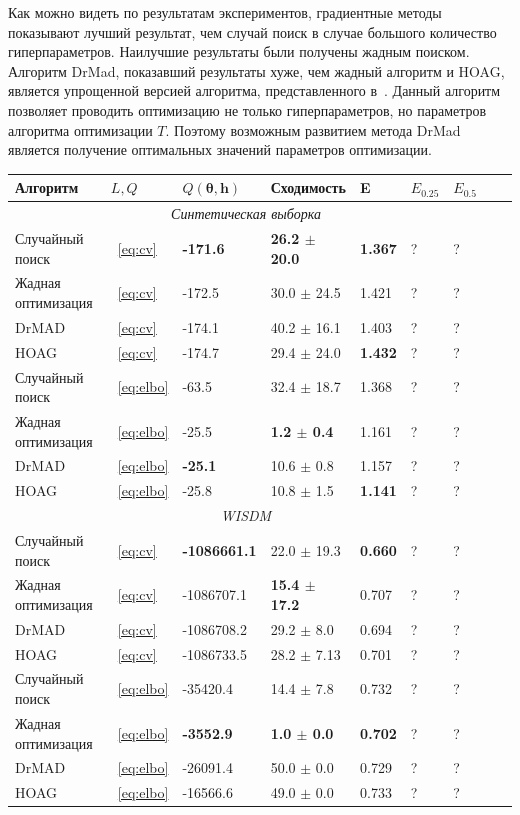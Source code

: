 Как можно видеть по результатам экспериментов, градиентные методы показывают лучший результат, чем случай поиск в случае большого количество гиперпараметров. Наилучшие результаты были получены жадным поиском. Алгоритм DrMad, показавший результаты хуже, чем жадный алгоритм и HOAG, является упрощенной версией алгоритма, представленного в~\cite{hyper_mad}. Данный алгоритм позволяет проводить оптимизацию не только гиперпараметров, но параметров алгоритма оптимизации $T$. Поэтому возможным развитием  метода DrMad является получение оптимальных значений параметров оптимизации.

\begin{table}
\small
\begin{tabularx}{\textwidth}{ |X|X|X|X|X|X|X|X|X|}

\hline
\textbf{Алгоритм} & $L, Q$  & $Q(\boldsymbol{\theta}, \mathbf{h})$ & Сходимость & E & $E_{0.25}$ & $E_{0.5}$\\ 
\hline
\multicolumn{7}{|c|}{\textit{Синтетическая выборка}}  \\
\hline
Случайный поиск & ~\eqref{eq:cv} & \bf -171.6  &\bf 26.2 $\pm$ 20.0  & \bf 1.367 & ? & ? \\
\hline
Жадная оптимизация & ~\eqref{eq:cv} & -172.5 & 30.0 $\pm$ 24.5 & 1.421 & ? & ? \\
\hline
DrMAD & ~\eqref{eq:cv} & -174.1 & 40.2 $\pm$ 16.1 &  1.403 & ? & ?\\
\hline
HOAG & ~\eqref{eq:cv} &-174.7 & 29.4 $\pm$ 24.0 &   \bf 1.432  & ? & ?\\
\hline
Случайный поиск & ~\eqref{eq:elbo} & -63.5  & 32.4 $\pm$ 18.7  & 1.368 & ? & ?  \\
\hline
Жадная оптимизация & ~\eqref{eq:elbo} & -25.5 & \bf 1.2 $\pm$ 0.4 & 1.161 & ? & ?\\
\hline
DrMAD & ~\eqref{eq:elbo} & \bf -25.1 &  10.6 $\pm$ 0.8 &  1.157 & ? & ?\\
\hline
HOAG & ~\eqref{eq:elbo} &-25.8 & 10.8 $\pm$ 1.5&   \bf 1.141  & ? & ?\\
\hline


\multicolumn{7}{|c|}{\textit{WISDM}}  \\
\hline
Случайный поиск & ~\eqref{eq:cv} & \bf -1086661.1  & 22.0 $\pm$ 19.3  & \bf 0.660 & ? & ? \\
\hline
Жадная оптимизация & ~\eqref{eq:cv} & -1086707.1 & \bf 15.4 $\pm$ 17.2 & 0.707 & ? & ? \\
\hline
DrMAD & ~\eqref{eq:cv} & -1086708.2 & 29.2 $\pm$ 8.0 &  0.694 & ? & ? \\
\hline
HOAG & ~\eqref{eq:cv} & -1086733.5 & 28.2 $\pm$ 7.13&   0.701 & ? & ? \\
\hline
Случайный поиск & ~\eqref{eq:elbo} & -35420.4 &   14.4 $\pm$ 7.8  &   0.732 & ? & ? \\
\hline
Жадная оптимизация & ~\eqref{eq:elbo} & \bf -3552.9 &\bf 1.0 $\pm$ 0.0  &   \bf 0.702 & ? & ? \\
\hline
DrMAD & ~\eqref{eq:elbo} & -26091.4 &   50.0 $\pm$ 0.0  & 0.729 & ? & ? \\
\hline
HOAG & ~\eqref{eq:elbo} &  -16566.6 & 49.0 $\pm$ 0.0  &  0.733 & ? & ? \\
\hline




\end{tabularx}
\end{table}
